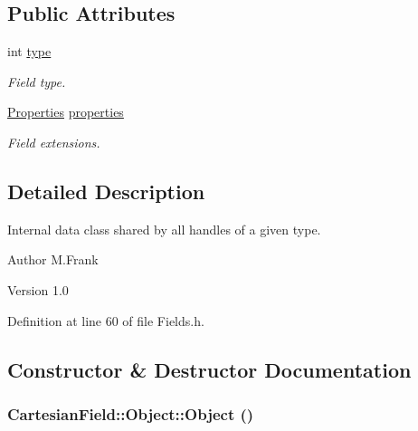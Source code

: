 \subsection*{Public Attributes}
\begin{DoxyCompactItemize}
\item 
int \hyperlink{class_d_d4hep_1_1_geometry_1_1_cartesian_field_1_1_object_a661abde32b68651dc0542aabbe9e448c}{type}
\begin{DoxyCompactList}\small\item\em Field type. \item\end{DoxyCompactList}\item 
\hyperlink{class_d_d4hep_1_1_geometry_1_1_cartesian_field_a37a636b9f5ee9ead172cca958dacb920}{Properties} \hyperlink{class_d_d4hep_1_1_geometry_1_1_cartesian_field_1_1_object_a146cdd5fa292df237112a461ccaa0f6c}{properties}
\begin{DoxyCompactList}\small\item\em Field extensions. \item\end{DoxyCompactList}\end{DoxyCompactItemize}


\subsection{Detailed Description}
Internal data class shared by all handles of a given type. \begin{DoxyAuthor}{Author}
M.Frank 
\end{DoxyAuthor}
\begin{DoxyVersion}{Version}
1.0 
\end{DoxyVersion}


Definition at line 60 of file Fields.h.

\subsection{Constructor \& Destructor Documentation}
\hypertarget{class_d_d4hep_1_1_geometry_1_1_cartesian_field_1_1_object_ae9c0b05f25b59b27e047ddf7538dbe2b}{
\subsubsection[{Object}]{\setlength{\rightskip}{0pt plus 5cm}CartesianField::Object::Object ()}}
\label{class_d_d4hep_1_1_geometry_1_1_cartesian_field_1_1_object_ae9c0b05f25b59b27e047ddf7538dbe2b}


